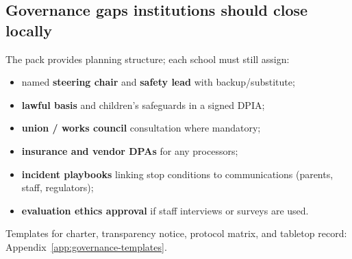 \subsection{Governance gaps institutions should close locally}

The pack provides planning structure; each school must still assign:
\begin{itemize}[noitemsep]
  \item named \textbf{steering chair} and \textbf{safety lead} with backup/substitute;
  \item \textbf{lawful basis} and children's safeguards in a signed DPIA;
  \item \textbf{union / works council} consultation where mandatory;
  \item \textbf{insurance and vendor DPAs} for any processors;
  \item \textbf{incident playbooks} linking stop conditions to communications (parents, staff, regulators);
  \item \textbf{evaluation ethics approval} if staff interviews or surveys are used.
\end{itemize}

Templates for charter, transparency notice, protocol matrix, and tabletop record:
Appendix~\ref{app:governance-templates}.
